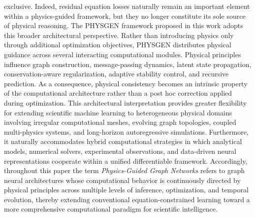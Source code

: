 exclusive. Indeed, residual equation losses naturally remain an important element within a physics-guided framework, but they no longer constitute its sole source of physical reasoning. The PHYSGEN framework proposed in this work adopts this broader architectural perspective. Rather than introducing physics only through additional optimization objectives, PHYSGEN distributes physical guidance across several interacting computational modules. Physical principles influence graph construction, message-passing dynamics, latent state propagation, conservation-aware regularization, adaptive stability control, and recursive prediction. As a consequence, physical consistency becomes an intrinsic property of the computational architecture rather than a post hoc correction applied during optimization. This architectural interpretation provides greater flexibility for extending scientific machine learning to heterogeneous physical domains involving irregular computational meshes, evolving graph topologies, coupled multi-physics systems, and long-horizon autoregressive simulations. Furthermore, it naturally accommodates hybrid computational strategies in which analytical models, numerical solvers, experimental observations, and data-driven neural representations cooperate within a unified differentiable framework. Accordingly, throughout this paper the term \emph{Physics-Guided Graph Networks} refers to graph neural architectures whose computational behavior is continuously directed by physical principles across multiple levels of inference, optimization, and temporal evolution, thereby extending conventional equation-constrained learning toward a more comprehensive computational paradigm for scientific intelligence. \] 
